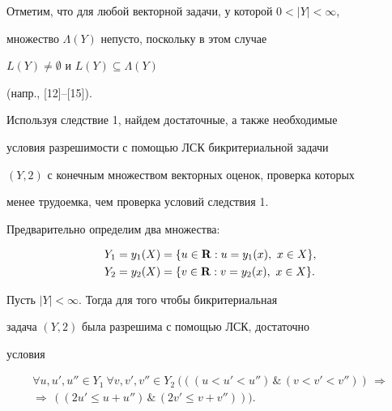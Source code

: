  


Отметим, что для любой векторной задачи, у которой $0<|Y|<\infty$, 


множество $\Lambda(Y)$ непусто, поскольку в этом случае 


$L(Y)\ne\emptyset$ и $L(Y)\subseteq\Lambda(Y)$ 


(напр., [12]--[15]). 


 


Используя следствие 1, найдем достаточные, а также необходимые 


условия разрешимости с помощью ЛСК бикритериальной задачи 


$(Y,2)$ с конечным множеством векторных оценок, проверка которых 


менее трудоемка, чем проверка условий следствия 1. 


 


Предварительно определим два множества: 


\begin{align*} 


&Y_1=y_1(X)=\{u\in\bold R:u=y_1(x),\ x\in X\},\\ 


&Y_2=y_2(X)=\{v\in\bold R:v=y_2(x),\ x\in X\}.


\end{align*} 


 


\begin{cor} Пусть $|Y|<\infty$. Тогда для того чтобы бикритериальная 


задача $(Y,2)$ была разрешима с помощью ЛСК, достаточно


условия


\begin{multline} 


\forall u,u',u''\in Y_1\ \forall v,v',v''\in Y_2 


\ (((u<u'<u'')\,\&\,(v<v'<v''))\,


\Longrightarrow\\


\Longrightarrow\,((2u'\le u+u'')\,\&\,(2v'\le v+v''))).


\end{multline} 


\end{cor} 


 


